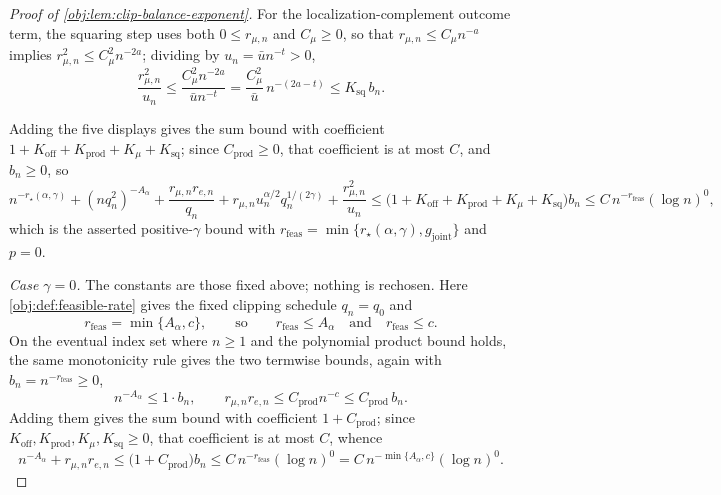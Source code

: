 \documentclass[11pt]{article}
\begin{document}
\begin{proof}[Proof of \cref{obj:lem:clip-balance-exponent}]
For the localization-complement outcome term, the squaring step uses both \(0\le r_{\mu,n}\) and \(C_\mu\ge0\), so that \(r_{\mu,n}\le C_\mu n^{-a}\) implies \(r_{\mu,n}^2\le C_\mu^2n^{-2a}\); dividing by \(u_n=\bar un^{-t}>0\),
\[
\frac{r_{\mu,n}^2}{u_n}
\le
\frac{C_\mu^2n^{-2a}}{\bar un^{-t}}
=
\frac{C_\mu^2}{\bar u}\,n^{-(2a-t)}
\le
K_{\mathrm{sq}}\,b_n .
\]

Adding the five displays gives the sum bound with coefficient \(1+K_{\mathrm{off}}+K_{\mathrm{prod}}+K_\mu+K_{\mathrm{sq}}\); since \(C_{\mathrm{prod}}\ge0\), that coefficient is at most \(C\), and \(b_n\ge0\), so
\[
n^{-r_\star(\alpha,\gamma)}+(nq_n^2)^{-A_\alpha}
+\frac{r_{\mu,n}r_{e,n}}{q_n}
+r_{\mu,n}u_n^{\alpha/2}q_n^{1/(2\gamma)}
+\frac{r_{\mu,n}^2}{u_n}
\le
\bigl(1+K_{\mathrm{off}}+K_{\mathrm{prod}}+K_\mu+K_{\mathrm{sq}}\bigr)b_n
\le
C\,n^{-r_{\mathrm{feas}}}(\log n)^0,
\]
which is the asserted positive-\(\gamma\) bound with \(r_{\mathrm{feas}}=\min\{r_\star(\alpha,\gamma),g_{\mathrm{joint}}\}\) and \(p=0\). %

\emph{Case \(\gamma=0\).}  The constants are those fixed above; nothing is rechosen.  Here \cref{obj:def:feasible-rate} gives the fixed clipping schedule \(q_n=q_0\) and
\[
r_{\mathrm{feas}}=\min\{A_\alpha,c\},
\qquad\text{so}\qquad
r_{\mathrm{feas}}\le A_\alpha
\quad\text{and}\quad
r_{\mathrm{feas}}\le c .
\]
On the eventual index set where \(n\ge1\) and the polynomial product bound holds, the same monotonicity rule gives the two termwise bounds, again with \(b_n=n^{-r_{\mathrm{feas}}}\ge0\),
\[
n^{-A_\alpha}\le 1\cdot b_n,
\qquad
r_{\mu,n}r_{e,n}\le C_{\mathrm{prod}}n^{-c}\le C_{\mathrm{prod}}\,b_n .
\]
Adding them gives the sum bound with coefficient \(1+C_{\mathrm{prod}}\); since \(K_{\mathrm{off}},K_{\mathrm{prod}},K_\mu,K_{\mathrm{sq}}\ge0\), that coefficient is at most \(C\), whence
\[
n^{-A_\alpha}+r_{\mu,n}r_{e,n}
\le
\bigl(1+C_{\mathrm{prod}}\bigr)b_n
\le
C\,n^{-r_{\mathrm{feas}}}(\log n)^0
=
C\,n^{-\min\{A_\alpha,c\}}(\log n)^0 .
\]
\end{proof}
\end{document}
